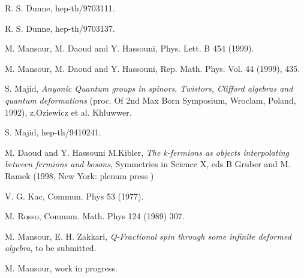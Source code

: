 \documentclass[a4paper,12pt,thmsa]{article}
\begin{document}
\myHighlight{$[17]$}\coordHE{} R. S. Dunne, hep-th/9703111.

\myHighlight{$[18]$}\coordHE{} R. S. Dunne, hep-th/9703137.

\myHighlight{$[19]$}\coordHE{} M. Mansour, M. Daoud and Y. Hassouni, Phys. Lett. B 454 (1999).

\myHighlight{$[20]$}\coordHE{} M. Mansour, M. Daoud and Y. Hassouni, Rep. Math. Phys. Vol. 44
(1999), 435.

\myHighlight{$[21]$}\coordHE{} S. Majid, \textit{Anyonic Quantum groups in spinors}, \textit{%
Twistors, Clifford algebras and} \textit{quantum deformations} (proc. Of 2nd
Max Born Symposium, Wroclam, Poland, 1992), z.Oziewicz et al. Khluwwer.

\myHighlight{$[22]$}\coordHE{} S. Majid, hep-th/9410241.

\myHighlight{$[23]$}\coordHE{} M. Daoud and Y. Hassouni M.Kibler, \textit{The k-fermions as objects
interpolating} \textit{between fermions and bosons}, Symmetries in Science
X, eds B Gruber and M. Ramek (1998, New York: plenum press )

\myHighlight{$[24]$}\coordHE{} V. G. Kac, Commun. Phys 53 (1977).

\myHighlight{$[25]$}\coordHE{} M. Rosso, Commun. Math. Phys 124 (1989) 307.

\myHighlight{$[26]$}\coordHE{} M. Mansour, E. H. Zakkari, \textit{Q-Fractional spin through some
infinite deformed} \textit{algebra}, to be submitted.

\myHighlight{$[27]$}\coordHE{} M. Mansour, work in progress.
\end{document}
